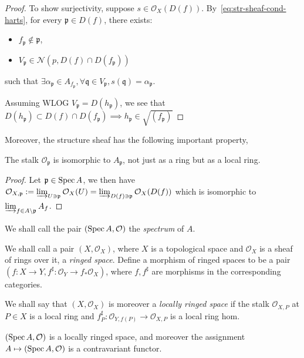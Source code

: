 \documentclass[000-main.tex]{subfiles}
\begin{document}
\begin{proof}
  To show surjectivity, suppose $s\in \mathcal{O}_X(D(f))$.
  By~\eqref{eq:str-sheaf-cond-harts}, for every $\mathfrak{p}\in D(f)$, there exists:
  \begin{itemize}
    \item $f_\mathfrak{p}\not\in \mathfrak{p}$,
    \item $V_\mathfrak{p}\in \mathcal{N}(p, D(f)\cap D(f_\mathfrak{p}))$
  \end{itemize}
  such that $\exists \alpha_\mathfrak{p}\in A_{f_\mathfrak{p}}, \forall \mathfrak{q}\in V_\mathfrak{p}, s(\mathfrak{q}) = \alpha_\mathfrak{p}$.

  Assuming WLOG $V_\mathfrak{p} = D(h_\mathfrak{p})$, we see that $D(h_\mathfrak{p}) \subset D(f)\cap D(f_\mathfrak{p}) \implies h_\mathfrak{p}\in \sqrt{(f_\mathfrak{p})}$
\end{proof}

Moreover, the structure sheaf has the following important property,
\begin{lemma}
  The stalk $\mathcal{O}_{\mathfrak{p}}$ is isomorphic to $A_{\mathfrak{p}}$, not just as a ring but as a local ring.
\end{lemma}
\begin{proof}\TOPROVE
  Let $\mathfrak{p}\in\operatorname{Spec} A$, we then have $\mathcal{O}_{X,\mathfrak{p}} := \varinjlim_{U\ni\mathfrak{p}}\mathcal{O}_X(U) = \varinjlim_{D(f)\ni\mathfrak{p}}\mathcal{O}_X(D(f))$ which is isomorphic to $\varinjlim_{f\in A\setminus\mathfrak{p}}A_f$.
\end{proof}

We shall call the pair $(\operatorname{Spec} A, \mathcal{O})$ the \emph{spectrum} of $A$. 

\begin{definition}
  We shall call a pair $(X, \mathcal{O}_X)$, where $X$ is a topological space and $\mathcal{O}_X$ is a sheaf of rings over it, a \emph{ringed space}.
  Define a morphism of ringed spaces to be a pair $(f : X \to Y, f^\sharp : \mathcal{O}_Y \to f_\ast \mathcal{O}_X)$, where $f, f^\sharp$ are morphisms in the corresponding categories.

  We shall say that $(X, \mathcal{O}_X)$ is moreover a \emph{locally ringed space} if the stalk $\mathcal{O}_{X, P}$ at $P \in X$ is a local ring and $f^\sharp_P : \mathcal{O}_{Y, f(P)} \to \mathcal{O}_{X, P}$ is a local ring hom.
\end{definition}

\begin{example}
  $(\operatorname{Spec} A, \mathcal{O})$ is a locally ringed space, and moreover the assignment $A \mapsto (\operatorname{Spec} A , \mathcal{O})$ is a contravariant functor.
\end{example}
\end{document}
